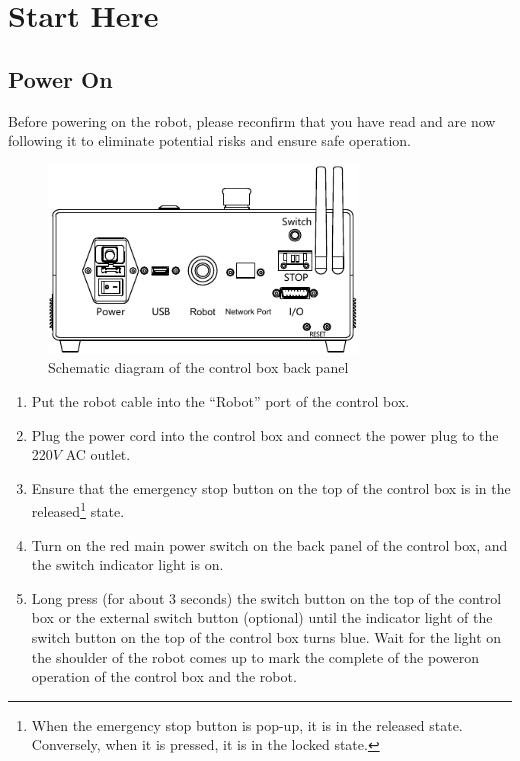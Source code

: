 \chapter{Start Here}
\label{cha:基础操作}

\section{Power On}

Before powering on the robot, please reconfirm that you have read  and are now following it to eliminate potential risks and ensure safe operation.

\begin{figure}[hb]
    \centering
    \includegraphics[height=5cm]{en/image/robot_control_box_back.pdf}
    \caption{Schematic diagram of the control box back panel}
    \label{fig:控制箱背板示意图}
\end{figure}

\begin{enumerate}
\item Put the robot cable into the ``Robot'' port of the control box.
\item Plug the power cord into the control box and connect the power plug to the 220$\unit{V}$ AC outlet.
\item Ensure that the emergency stop button on the top of the control box is in the released\footnote{When the emergency stop button is pop-up, it is in the released state. Conversely, when it is pressed, it is in the locked state.} state.
\item Turn on the red main power switch on the back panel of the control box, and the switch indicator light is on.
\item Long press (for about 3 seconds) the switch button on the top of the control box or the external switch button (optional) until the indicator light of the switch button on the top of the control box turns blue. Wait for the light on the shoulder of the robot comes up to mark the complete of the power­on operation of the control box and the robot.
\end{enumerate}

